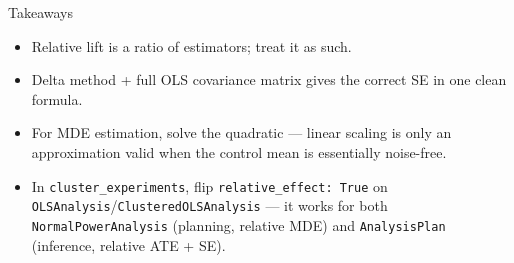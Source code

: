 \documentclass[10pt]{beamer}
\begin{document}
\begin{frame}{Takeaways}
\begin{itemize}
  \item Relative lift is a \alert{ratio of estimators}; treat it as such.
  \item Delta method + full OLS covariance matrix gives the correct SE in one clean formula.
  \item For MDE estimation, solve the \alert{quadratic} --- linear scaling is only an approximation valid when the control mean is essentially noise-free.
  \item In \texttt{cluster\_experiments}, flip \texttt{relative\_effect: True} on \texttt{OLSAnalysis}/\texttt{ClusteredOLSAnalysis} --- it works for both \texttt{NormalPowerAnalysis} (planning, relative MDE) and \texttt{AnalysisPlan} (inference, relative ATE + SE).
\end{itemize}
\end{frame}
\end{document}
